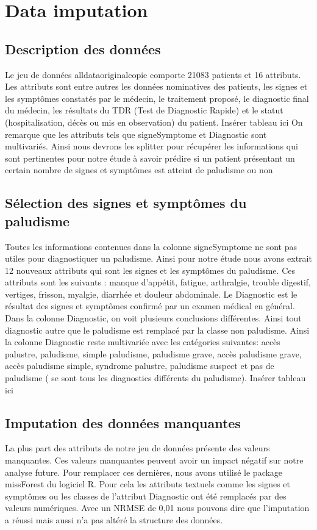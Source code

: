 \section{Data imputation}\label{data_prep}
\subsection{Description des données}
Le jeu de données alldataoriginalcopie
comporte 21083 patients et 16 attributs. Les attributs sont entre autres les données nominatives des patients, les signes et les symptômes constatés par le médecin, le traitement proposé, le diagnostic  final du médecin, les résultats du TDR (Test de Diagnostic Rapide)  et le statut (hospitalisation, décès ou mis en observation) du patient.
Insérer tableau ici
On remarque que les attributs tels que signeSymptome et  Diagnostic sont multivariés. Ainsi nous devrons les splitter pour récupérer les informations qui sont pertinentes pour notre étude à savoir prédire si un patient présentant un certain nombre de signes et symptômes est atteint de paludisme ou non
\subsection{Sélection  des signes et symptômes   du paludisme}
Toutes les informations contenues dans la colonne signeSymptome ne sont pas utiles pour diagnostiquer un  paludisme. Ainsi pour notre étude nous avons extrait 12 nouveaux attributs qui sont les signes et les symptômes du paludisme. Ces attributs sont les suivants : manque d'appétit, fatigue, arthralgie, trouble digestif, vertiges, frisson, myalgie, diarrhée et  douleur abdominale.
Le Diagnostic est le résultat des signes et symptômes confirmé par un examen médical en général. 
Dans la colonne Diagnostic, on voit plusieurs conclusions différentes. Ainsi tout diagnostic autre que le paludisme est remplacé par la classe non paludisme. Ainsi la colonne Diagnostic reste multivariée avec les catégories suivantes: accès palustre, paludisme, simple paludisme, paludisme grave, accès paludisme grave, accès paludisme simple, syndrome palustre, paludisme suspect et pas de paludisme ( se sont tous les diagnostics différents du paludisme).
Insérer tableau ici
\subsection{Imputation des données manquantes}
La plus part des attributs de notre jeu de données présente des valeurs manquantes. Ces valeurs manquantes peuvent avoir un impact négatif sur notre analyse future. Pour remplacer ces dernières, nous avons utilisé le package missForest du logiciel R.
Pour cela les attributs textuels comme les signes et symptômes ou les classes de l’attribut Diagnostic 
ont été remplacés par des valeurs numériques.
 Avec un  NRMSE de 0,01  nous pouvons dire que l’imputation a réussi mais aussi n’a pas altéré 
 la structure des données.
